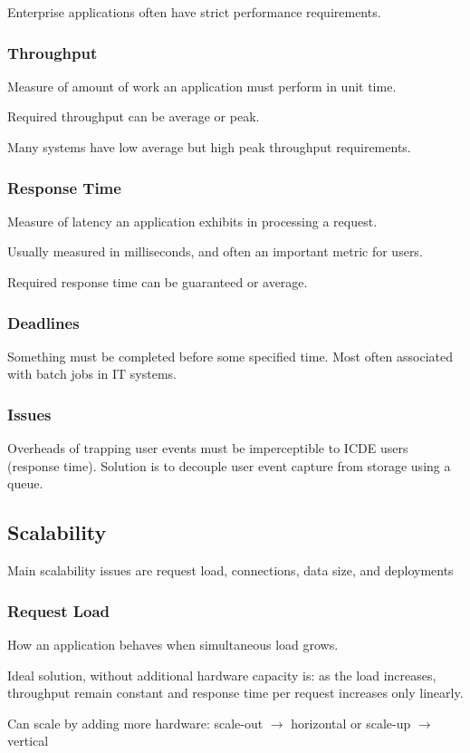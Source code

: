 \documentclass[11pt]{article}
\begin{document}
Enterprise applications often have strict performance requirements.
\subsubsection{Throughput}
\label{sec:orgbe0bbbb}
Measure of amount of work an application must perform in unit time.

Required throughput can be average or peak.

Many systems have low average but high peak throughput requirements.
\subsubsection{Response Time}
\label{sec:org7590cb9}
Measure of latency an application exhibits in processing a request.

Usually measured in milliseconds, and often an important metric for users.

Required response time can be guaranteed or average.
\subsubsection{Deadlines}
\label{sec:org80fb85a}
Something must be completed before some specified time.
Most often associated with batch jobs in IT systems.
\subsubsection{Issues}
\label{sec:org41bc076}
Overheads of trapping user events must be imperceptible to ICDE users
(response time).
Solution is to decouple user event capture from storage using a queue.
\subsection{Scalability}
\label{sec:org4cfdd03}
Main scalability issues are request load, connections, data size, and deployments
\subsubsection{Request Load}
\label{sec:org41de869}
How an application behaves when simultaneous load grows.

Ideal solution, without additional hardware capacity is: as the load increases, throughput remain
constant and response time per request increases only linearly.

Can scale by adding more hardware: scale-out \(\to\) horizontal or scale-up \(\to\) vertical
\end{document}
